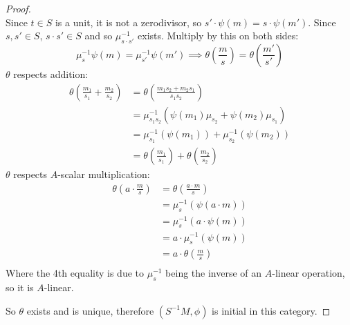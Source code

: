 \documentclass[hidelinks,12pt]{article}
\begin{document}
\begin{proof}
\[    \]
    Since \(t\in S\) is a unit, it is not a zerodivisor, so \(s'\cdot\psi(m)=s\cdot\psi(m')\). Since \(s,s'\in S\), \(s\cdot s'\in S\) and so \(\mu_{s\cdot s'}^{-1}\) exists. Multiply by this on both sides:\[
        \mu_{s}^{-1}\psi(m)=\mu_{s'}^{-1}\psi(m')\implies\theta\left(\frac{m}{s}\right)=\theta\left(\frac{m'}{s'}\right)
    \]
    \(\theta\) respects addition: \begin{align*}
        \theta\left(\frac{m_{1}}{s_{1}}+\frac{m_{2}}{s_{2}}\right)&=\theta\left(\frac{m_{1}s_{2}+m_{2}s_{1}}{s_{1}s_{2}}\right)\\
                                                                  &=\mu_{s_{1}s_{2}}^{-1}\left(\psi(m_{1})\mu_{s_{2}}+\psi(m_{2})\mu_{s_{1}}\right)\\
                                                                  &=\mu_{s_{1}}^{-1}\left(\psi(m_{1})\right)+\mu_{s_{2}}^{-1}(\psi(m_{2}))\\
                                                                  &=\theta\left(\frac{m_{1}}{s_{1}}\right)+\theta\left(\frac{m_{2}}{s_{2}}\right)
    \end{align*}
    \(\theta\) respects \(A\)-scalar multiplication:
    \begin{align*}
        \theta\left(a\cdot \frac{m}{s}\right)&=\theta\left(\frac{a\cdot m}{s}\right)\\
                                             &=\mu_{s}^{-1}\left(\psi(a\cdot m)\right)\\
                                             &=\mu_{s}^{-1}\left(a\cdot\psi(m)\right)\\
                                             &=a\cdot \mu_{s}^{-1}\left(\psi(m)\right)\\
                                             &=a\cdot\theta\left(\frac{m}{s}\right)\\
    \end{align*}
    Where the 4th equality is due to \(\mu_{s}^{-1}\) being the inverse of an \(A\)-linear operation, so it is \(A\)-linear.
    \par So \(\theta\) exists and is unique, therefore \((S^{-1}M,\phi)\) is initial in this category.
\end{proof}
\end{document}
